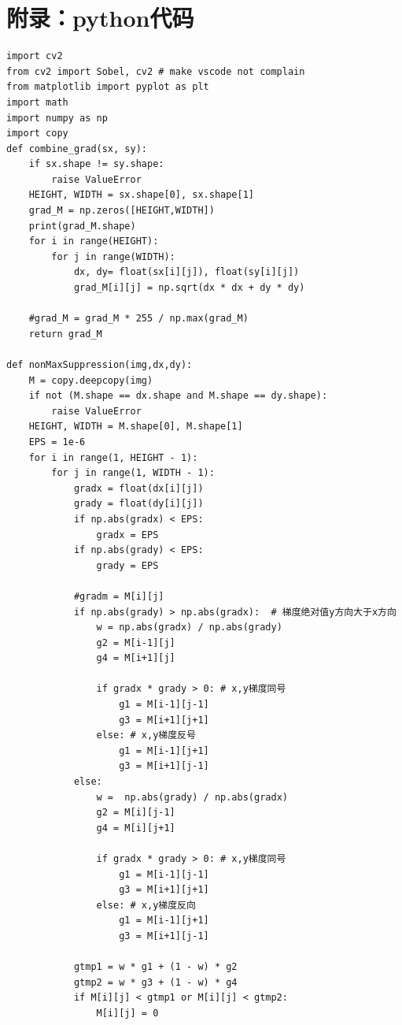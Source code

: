 \documentclass[12pt,a4paper]{article}
\begin{document}
\section{附录：python代码}
\begin{lstlisting}[style=py]
import cv2
from cv2 import Sobel, cv2 # make vscode not complain
from matplotlib import pyplot as plt
import math
import numpy as np
import copy
def combine_grad(sx, sy):
    if sx.shape != sy.shape:
        raise ValueError 
    HEIGHT, WIDTH = sx.shape[0], sx.shape[1]
    grad_M = np.zeros([HEIGHT,WIDTH])
    print(grad_M.shape)
    for i in range(HEIGHT):
        for j in range(WIDTH):
            dx, dy= float(sx[i][j]), float(sy[i][j])
            grad_M[i][j] = np.sqrt(dx * dx + dy * dy)
    
    #grad_M = grad_M * 255 / np.max(grad_M)
    return grad_M

def nonMaxSuppression(img,dx,dy):
    M = copy.deepcopy(img)
    if not (M.shape == dx.shape and M.shape == dy.shape):
        raise ValueError 
    HEIGHT, WIDTH = M.shape[0], M.shape[1]
    EPS = 1e-6
    for i in range(1, HEIGHT - 1):
        for j in range(1, WIDTH - 1):
            gradx = float(dx[i][j])
            grady = float(dy[i][j])
            if np.abs(gradx) < EPS:
                gradx = EPS
            if np.abs(grady) < EPS:
                grady = EPS
                
            #gradm = M[i][j]
            if np.abs(grady) > np.abs(gradx):  # 梯度绝对值y方向大于x方向
                w = np.abs(gradx) / np.abs(grady)
                g2 = M[i-1][j]
                g4 = M[i+1][j]
                
                if gradx * grady > 0: # x,y梯度同号
                    g1 = M[i-1][j-1]
                    g3 = M[i+1][j+1]
                else: # x,y梯度反号
                    g1 = M[i-1][j+1]
                    g3 = M[i+1][j-1]
            else:
                w =  np.abs(grady) / np.abs(gradx)
                g2 = M[i][j-1]
                g4 = M[i][j+1]
                
                if gradx * grady > 0: # x,y梯度同号
                    g1 = M[i-1][j-1]
                    g3 = M[i+1][j+1]
                else: # x,y梯度反向
                    g1 = M[i-1][j+1]
                    g3 = M[i+1][j-1]
            
            gtmp1 = w * g1 + (1 - w) * g2
            gtmp2 = w * g3 + (1 - w) * g4
            if M[i][j] < gtmp1 or M[i][j] < gtmp2:
                M[i][j] = 0


\end{lstlisting}
\end{document}
